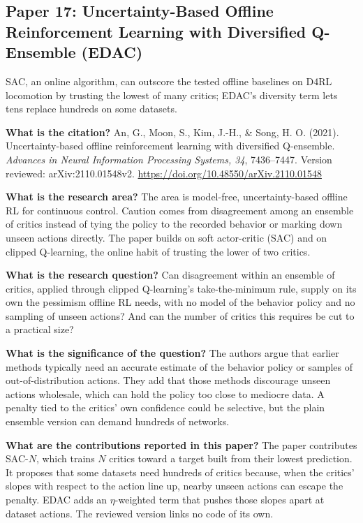 \documentclass[11pt]{article}
\newcommand{\paper}[1]{\subsection*{#1}}
\newcommand{\q}[2]{\item \textbf{#1} #2}
\begin{document}
\paper{Paper 17: Uncertainty-Based Offline Reinforcement Learning with Diversified Q-Ensemble (EDAC)}
SAC, an online algorithm, can outscore the tested offline baselines on D4RL locomotion by trusting the lowest of many critics; EDAC's diversity term lets tens replace hundreds on some datasets.
\begin{qna}

\q{What is the citation?}
An, G., Moon, S., Kim, J.-H., \& Song, H. O. (2021). Uncertainty-based offline reinforcement learning with diversified Q-ensemble. \emph{Advances in Neural Information Processing Systems, 34}, 7436--7447. Version reviewed: arXiv:2110.01548v2. \url{https://doi.org/10.48550/arXiv.2110.01548}

\q{What is the research area?}
The area is model-free, uncertainty-based offline RL for continuous control. Caution comes from disagreement among an ensemble of critics instead of tying the policy to the recorded behavior or marking down unseen actions directly. The paper builds on soft actor-critic (SAC) and on clipped Q-learning, the online habit of trusting the lower of two critics.

\q{What is the research question?}
Can disagreement within an ensemble of critics, applied through clipped Q-learning's take-the-minimum rule, supply on its own the pessimism offline RL needs, with no model of the behavior policy and no sampling of unseen actions? And can the number of critics this requires be cut to a practical size?

\q{What is the significance of the question?}
The authors argue that earlier methods typically need an accurate estimate of the behavior policy or samples of out-of-distribution actions. They add that those methods discourage unseen actions wholesale, which can hold the policy too close to mediocre data. A penalty tied to the critics' own confidence could be selective, but the plain ensemble version can demand hundreds of networks.

\q{What are the contributions reported in this paper?}
The paper contributes SAC-$N$, which trains $N$ critics toward a target built from their lowest prediction. It proposes that some datasets need hundreds of critics because, when the critics' slopes with respect to the action line up, nearby unseen actions can escape the penalty. EDAC adds an $\eta$-weighted term that pushes those slopes apart at dataset actions. The reviewed version links no code of its own.


\end{qna}
\end{document}
